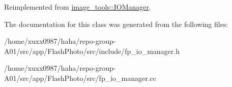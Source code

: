 Reimplemented from \hyperlink{classimage__tools_1_1IOManager_a5038100a2a640a3343c4715101eec120}{image\+\_\+tools\+::\+I\+O\+Manager}.



The documentation for this class was generated from the following files\+:\begin{DoxyCompactItemize}
\item 
/home/xuxx0987/haha/repo-\/group-\/\+A01/src/app/\+Flash\+Photo/src/include/fp\+\_\+io\+\_\+manager.\+h\item 
/home/xuxx0987/haha/repo-\/group-\/\+A01/src/app/\+Flash\+Photo/src/fp\+\_\+io\+\_\+manager.\+cc\end{DoxyCompactItemize}
